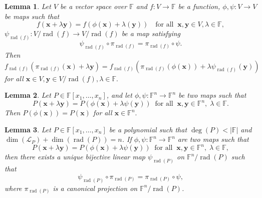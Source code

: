 \documentclass[10pt,a4paper]{amsart}
\newtheorem{lemma}{Lemma}
\def\F{{\mathbb F}}
\DeclareMathOperator{\rad}{rad}
\begin{document}
\begin{lemma}\label{lem:TwoCondLift}
Let $V$ be a vector space over $\F$ and $f\colon V \to \F$ be a function, $\phi, \psi \colon V \to V$ be maps such that
\begin{equation}\label{lem:TwoCondLift:eqq1}
f(\mathbf x + \lambda \mathbf y) = f(\phi(\mathbf x) + \lambda (\mathbf y))\quad\mbox{for all}\;\;\mathbf x, \mathbf y \in V, \lambda \in \F,
\end{equation}
$\psi_{\rad(f)}\colon V/\rad(f) \to V/\rad(f)$ be a map satisfying
\begin{equation}\label{lem:TwoCondLift:eqq2}
\psi_{\rad(f)} \circ \pi_{\rad(f)} = \pi_{\rad(f)} \circ \psi. 
\end{equation}
Then
\begin{equation*}\label{lem:TwoCondLift:eqq3}
f_{\rad(f)}(\pi_{\rad(f)}(\mathbf x) + \lambda \mathbf y) = f_{\rad(f)}(\pi_{\rad(f)}(\phi(\mathbf x)) + \lambda \psi_{\rad(f)}(\mathbf y))
\end{equation*}
for all $\mathbf x \in V, \mathbf y \in V/\rad(f), \lambda \in \F.$
\end{lemma}

\begin{lemma}\label{lem:condimpliesphi}Let $P \in \F[x_1,\ldots, x_n]$, and let $\phi, \psi \colon \F^n \to \F^n$ be two maps such that
\begin{equation}\label{lem:condimpliesphi:eqq1}
P(\mathbf{x} + \lambda \mathbf{y}) = P(\phi(\mathbf{x}) + \lambda \psi(\mathbf{y}))\;\;\mbox{for all}\;\;\mathbf{x},\mathbf{y} \in \mathbb \F^n,\; \lambda \in \F.
\end{equation}
Then $P(\phi(\mathbf x)) = P (\mathbf x)$ for all $\mathbf x \in \F^n.$
\end{lemma}

\begin{lemma}\label{lem:PPhiPsi}Let $P \in \F[x_1,\ldots, x_n]$ be a polynomial such that $\deg (P) < |\F|$ and $\dim (\mathcal L_P) + \dim (\rad(P)) = n$.  If  $\phi, \psi \colon \F^n \to \F^n$ are two maps such that
\begin{equation}\label{lem:PPhiPsi:eqq1}
P(\mathbf{x} + \lambda \mathbf{y}) = P(\phi(\mathbf{x}) + \lambda \psi(\mathbf{y}))\;\;\mbox{for all}\;\;\mathbf{x},\mathbf{y} \in \mathbb \F^n,\; \lambda \in \F,
\end{equation}
then there exists a unique bijective linear map $\psi_{\rad(P)}$ on $\F^n / \rad(P)$ such that 
\begin{equation}\label{lem:PPhiPsi:eq}
\psi_{\rad(P)} \circ \pi_{\rad(P)} = \pi_{\rad(P)} \circ \psi,
\end{equation}
 where $\pi_{\rad(P)}$ is a canonical projection on $\F^n / \rad(P)$.
\end{lemma} 
\end{document}
